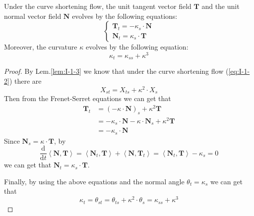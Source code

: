 \begin{lemma}\label{lem:I-1-4}
    Under the curve shortening flow, the unit tangent vector field $\mathbf{T}$ and the unit normal vector field $\mathbf{N}$ evolves by the following equations:
    \begin{equation}\label{eq:I-1-16}
        \begin{cases}
            \mathbf{T}_t=-\kappa_s\cdot\mathbf{N}\\
            \mathbf{N}_t=\kappa_s\cdot\mathbf{T}
        \end{cases}
    \end{equation}
    Moreover, the curvature $\kappa$ evolves by the following equation:
    \begin{equation}
        \kappa_t=\kappa_{ss}+\kappa^3
    \end{equation}
\end{lemma}

\begin{proof}
    By Lem.\ref{lem:I-1-3} we know that under the curve shortening flow (\ref{eq:I-1-2}) there are
    \begin{equation*}
        X_{st}=X_{ts}+\kappa^2\cdot X_s
    \end{equation*}
    Then from the Frenet-Serret equations we can get that
    \begin{align*}
        \mathbf{T}_t&={(-\kappa\cdot\mathbf{N})}_s+\kappa^2\mathbf{T}\\
        &=-\kappa_s\cdot\mathbf{N}-\kappa\cdot\mathbf{N}_s+\kappa^2\mathbf{T}\\
        &=-\kappa_s\cdot\mathbf{N}
    \end{align*}
    Since $\mathbf{N}_s=\kappa\cdot\mathbf{T}$, by
    \begin{equation*}
        \frac{\mathrm{d}}{\mathrm{d}t}\left<\mathbf{N},\mathbf{T}\right>=\left<\mathbf{N}_t,\mathbf{T}\right>+\left<\mathbf{N},\mathbf{T}_t\right>=\left<\mathbf{N}_t,\mathbf{T}\right>-\kappa_s=0
    \end{equation*}
    we can get that $\mathbf{N}_t=\kappa_s\cdot\mathbf{T}$.
    
    Finally, by using the above equations and the normal angle $\theta_t=\kappa_s$ we can get that
    \begin{equation*}
        \kappa_t=\theta_{st}=\theta_{ts}+\kappa^2\cdot\theta_s=\kappa_{ss}+\kappa^3
    \end{equation*}
\end{proof}


